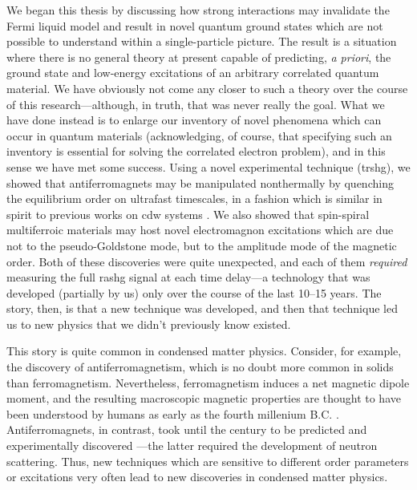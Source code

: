 We began this thesis by discussing how strong interactions may invalidate the Fermi liquid model and result in novel quantum ground states which are not possible to understand within a single-particle picture.
The result is a situation where there is no general theory at present capable of predicting, \textit{a priori}, the ground state and low-energy excitations of an arbitrary correlated quantum material.
We have obviously not come any closer to such a theory over the course of this research---although, in truth, that was never really the goal.
What we have done instead is to enlarge our inventory of novel phenomena which can occur in quantum materials (acknowledging, of course, that specifying such an inventory is essential for solving the correlated electron problem), and in this sense we have met some success.
Using a novel experimental technique (\gls{trshg}), we showed that antiferromagnets may be manipulated nonthermally by quenching the equilibrium order on ultrafast timescales, in a fashion which is similar in spirit to previous works on \gls{cdw} systems \citep{fausti_light-induced_2011,kogar_light-induced_2020}.
We also showed that spin-spiral multiferroic materials may host novel electromagnon excitations which are due not to the pseudo-Goldstone mode, but to the amplitude mode of the magnetic order.
Both of these discoveries were quite unexpected, and each of them \emph{required} measuring the full \gls{rashg} signal at each time delay---a technology that was developed (partially by us) only over the course of the last \num{10}--\num{15} years.
The story, then, is that a new technique was developed, and then that technique led us to new physics that we didn't previously know existed.

This story is quite common in condensed matter physics.
Consider, for example, the discovery of antiferromagnetism, which is no doubt more common in solids than ferromagnetism.
Nevertheless, ferromagnetism induces a net magnetic dipole moment, and the resulting macroscopic magnetic properties are thought to have been understood by humans as early as the fourth millenium B.C. \citep{magnetism_fundamentals}.
Antiferromagnets, in contrast, took until the  century to be predicted \citep{neel_properties_1948} and experimentally discovered \citep{shull_neutron_1951}---the latter required the development of neutron scattering.
Thus, new techniques which are sensitive to different order parameters or excitations very often lead to new discoveries in condensed matter physics.

